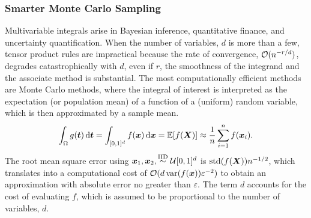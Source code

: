 \subsubsection{Smarter Monte Carlo Sampling}

Multivariable integrals arise in Bayesian inference, quantitative finance, and uncertainty quantification.  When the number of variables, $d$ is more than a few, tensor product rules are impractical because the rate of convergence, $\mathcal{O}(n^{-r/d})$, degrades catastrophically with $d$, even if $r$, the smoothness of the integrand and the associate method is substantial.  The most computationally efficient methods are Monte Carlo methods, where the integral of interest is interpreted as the expectation (or population mean) of a function of a (uniform) random variable, which is then approximated by a sample mean.
\begin{equation*}
    \int_{\Omega} g({\boldsymbol{t}}) \, \textup{d} {\boldsymbol{t}} = \int_{[0,1]^d} f({\boldsymbol{x}}) \, \textup{d} {\boldsymbol{x}} = \mathbb{E}[f({\boldsymbol{X}})] \approx \frac 1n \sum_{i=1}^n f({\boldsymbol{x}}_i).
\end{equation*}
The root mean square error using ${\boldsymbol{x}}_1, {\boldsymbol{x}}_2, \overset{\text{IID}}{\sim} {\mathcal{U}}[0,1]^d$ is $\operatorname{std}(f({\boldsymbol{X}})) n^{-1/2}$, which translates into a computational cost of $\mathcal{O}(d\operatorname{var}(f({\boldsymbol{x}}))\varepsilon^{-2})$ to obtain an approximation with absolute error no greater than $\varepsilon$. The term $d$ accounts for the cost of evaluating $f$, which is assumed to be proportional to the number of variables, $d$.

